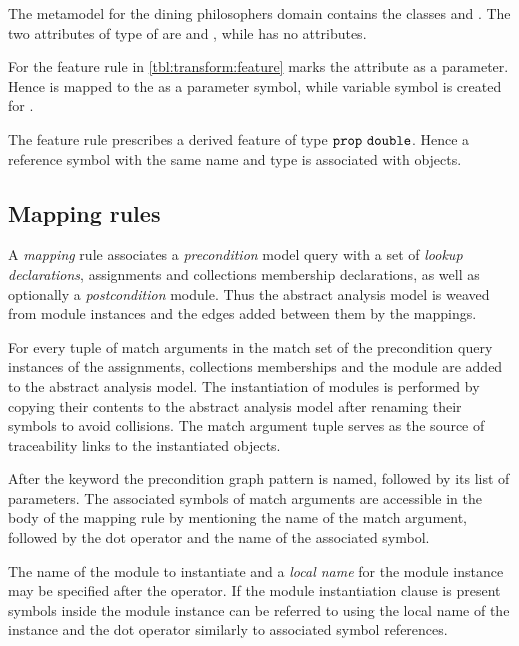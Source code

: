 \begin{runningExample}\label{ex:transform:feature}
  The metamodel for the dining philosophers domain contains the classes  and . The two attributes of type  of  are  and , while  has no attributes.

  For  the feature rule in \vref{tbl:transform:feature} marks the attribute  as a parameter. Hence  is mapped to the  as a parameter symbol, while  variable symbol is created for .

  The  feature rule prescribes a derived feature  of type \(\texttt{\upshape prop}\ \texttt{\upshape double}\). Hence a reference symbol with the same name and type is associated with  objects.
\end{runningExample}

\subsection{Mapping rules}

A \emph{mapping} rule associates a \emph{precondition} model query with a set of \emph{lookup declarations}, assignments and collections membership declarations, as well as optionally a \emph{postcondition}  module. Thus the abstract analysis model is weaved from  module instances and the edges added between them by the mappings.

For every tuple of match arguments in the match set of the precondition query instances of the assignments, collections memberships and the  module are added to the abstract analysis model. The instantiation of modules is performed by copying their contents to the abstract analysis model after renaming their symbols to avoid collisions. The match argument tuple serves as the source of traceability links to the instantiated objects.

After the keyword  the precondition graph pattern is named, followed by its list of parameters. The associated symbols of match arguments are accessible in the body of the mapping rule by mentioning the name of the match argument, followed by the dot operator and the name of the associated symbol.

The name of the  module to instantiate and a \emph{local name} for the module instance may be specified after the \lit{=>} operator. If the module instantiation clause is present symbols inside the module instance can be referred to using the local name of the instance and the dot operator similarly to associated symbol references.

